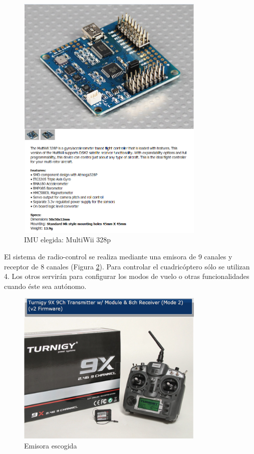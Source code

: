 \documentclass[12pt,twoside]{article}
\begin{document}
		\begin{figure}
					\centering
					\includegraphics[width=0.8\textwidth]{Imatges/Componentes/multiwii.png}
					\caption{IMU elegida: MultiWii 328p}
					\label{fig:multiwii}
			\end{figure}
		
		El sistema de radio-control se realiza mediante una emisora de 9 canales y receptor de 8 canales (Figura \ref{fig:emisora}). Para controlar el cuadricóptero sólo se utilizan 4. Los otros servirán para configurar los modos de vuelo o otras funcionalidades cuando éste sea autónomo.
		
		\begin{figure}
					\centering
					\includegraphics[width=0.8\textwidth]{Imatges/Componentes/emisora.png}
					\caption{Emisora escogida}
					\label{fig:emisora}
			\end{figure}
		
\end{document}
